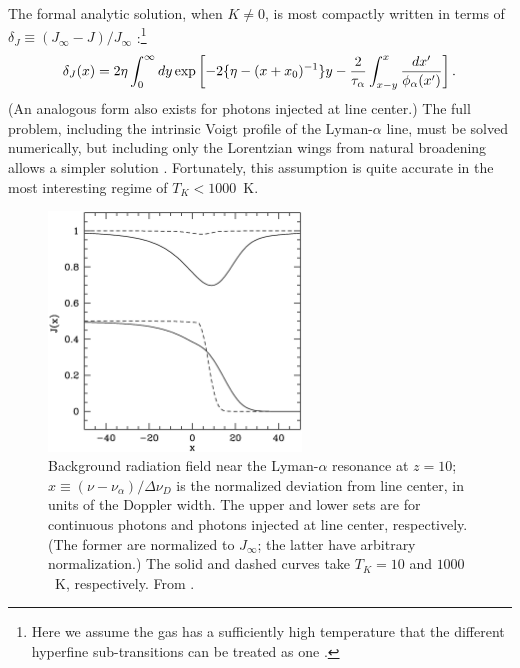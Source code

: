 The formal analytic solution, when $K \neq 0$, is most compactly written in terms of $\delta_J \equiv (J_\infty -
J)/J_\infty$ \cite{chen04}:\footnote{Here we assume the gas has a sufficiently high temperature that the different hyperfine sub-transitions can be treated as one \cite{hirata06}.}
\begin{equation}
\delta_J(x) = 2 \eta \int_0^\infty d y \exp \left[ - 2 \{ \eta - (x+x_0)^{-1}\} y - {2 \over \tau_\alpha} \int_{x-y}^{x} \frac{d x'}{\phi_\alpha(x')} \right].
\label{eq:dj-soln}
\end{equation}
(An analogous form also exists for photons injected at line center.) The full problem, including the intrinsic Voigt profile of the Lyman-$\alpha$ line, must be solved numerically, but including only the Lorentzian wings from natural broadening allows a simpler solution \cite{furl06-lyheat}.  Fortunately, this assumption is quite accurate in the most interesting regime of  $T_K <  1000$~K.

\begin{figure}[]
\begin{center}
\includegraphics[width=0.6\textwidth]{Furlanetto/figure2-4}
\end{center}
\caption{Background radiation field near the Lyman-$\alpha$ resonance at $z=10$;
$x \equiv (\nu-\nu_\alpha)/\Delta \nu_D$ is the normalized deviation
from line center, in units of the Doppler width.  The upper and lower sets are for continuous photons
and photons injected at line center, respectively.  (The former are
normalized to $J_\infty$; the latter have arbitrary normalization.)
The solid and dashed curves take $T_K=10$ and $1000$~K,
respectively.  From \cite{furl06-lyheat}.}
\label{fig:lyshape}
\end{figure}

